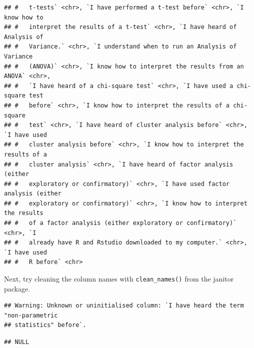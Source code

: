 \documentclass[
]{book}
\newenvironment{Shaded}{\begin{snugshade}}{\end{snugshade}}
\newcommand{\CommentTok}[1]{\textcolor[rgb]{0.56,0.35,0.01}{\textit{#1}}}
\newcommand{\DataTypeTok}[1]{\textcolor[rgb]{0.13,0.29,0.53}{#1}}
\newcommand{\KeywordTok}[1]{\textcolor[rgb]{0.13,0.29,0.53}{\textbf{#1}}}
\newcommand{\NormalTok}[1]{#1}
\newcommand{\OperatorTok}[1]{\textcolor[rgb]{0.81,0.36,0.00}{\textbf{#1}}}
\newcommand{\StringTok}[1]{\textcolor[rgb]{0.31,0.60,0.02}{#1}}
\begin{document}
\begin{verbatim}
## #   t-tests` <chr>, `I have performed a t-test before` <chr>, `I know how to
## #   interpret the results of a t-test` <chr>, `I have heard of Analysis of
## #   Variance.` <chr>, `I understand when to run an Analysis of Variance
## #   (ANOVA)` <chr>, `I know how to interpret the results from an ANOVA` <chr>,
## #   `I have heard of a chi-square test` <chr>, `I have used a chi-square test
## #   before` <chr>, `I know how to interpret the results of a chi-square
## #   test` <chr>, `I have heard of cluster analysis before` <chr>, `I have used
## #   cluster analysis before` <chr>, `I know how to interpret the results of a
## #   cluster analysis` <chr>, `I have heard of factor analysis (either
## #   exploratory or confirmatory)` <chr>, `I have used factor analysis (either
## #   exploratory or confirmatory)` <chr>, `I know how to interpret the results
## #   of a factor analysis (either exploratory or confirmatory)` <chr>, `I
## #   already have R and Rstudio downloaded to my computer.` <chr>, `I have used
## #   R before` <chr>
\end{verbatim}

Next, try cleaning the column names with \texttt{clean\_names()} from the janitor package.

\begin{Shaded}
\end{Shaded}

\begin{verbatim}
## Warning: Unknown or uninitialised column: `I have heard the term "non-parametric
## statistics" before`.
\end{verbatim}

\begin{verbatim}
## NULL
\end{verbatim}

\begin{Shaded}
\end{Shaded}
\end{document}

